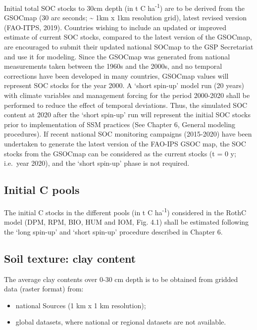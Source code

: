 \documentclass[
  10pt,
  b5paper,
]{book}
\providecommand{\tightlist}{%
  \setlength{\itemsep}{0pt}\setlength{\parskip}{0pt}}
\begin{document}
Initial total SOC stocks to 30cm depth (in t C ha\textsuperscript{-1}) are to be derived from the GSOCmap (30 arc seconds; \textasciitilde{} 1km x 1km resolution grid), latest revised version (FAO-ITPS, 2019). Countries wishing to include an updated or improved estimate of current SOC stocks, compared to the latest version of the GSOCmap, are encouraged to submit their updated national SOCmap to the GSP Secretariat and use it for modeling.
Since the GSOCmap was generated from national measurements taken between the 1960s and the 2000s, and no temporal corrections have been developed in many countries, GSOCmap values will represent SOC stocks for the year 2000. A `short spin-up' model run (20 years) with climate variables and management forcing for the period 2000-2020 shall be performed to reduce the effect of temporal deviations. Thus, the simulated SOC content at 2020 after the `short spin-up' run will represent the initial SOC stocks prior to implementation of SSM practices (See Chapter 6, General modeling procedures). If recent national SOC monitoring campaigns (2015-2020) have been undertaken to generate the latest version of the FAO-IPS GSOC map, the SOC stocks from the GSOCmap can be considered as the current stocks (t = 0 y; i.e.~year 2020), and the `short spin-up' phase is not required.

\hypertarget{initial-c-pools}{%
\subsection{Initial C pools}\label{initial-c-pools}}

The initial C stocks in the different pools (in t C ha\textsuperscript{-1}) considered in the RothC model (DPM, RPM, BIO, HUM and IOM, Fig. 4.1) shall be estimated following the `long spin-up' and `short spin-up' procedure described in Chapter 6.

\hypertarget{soil-texture-clay-content}{%
\subsection{Soil texture: clay content}\label{soil-texture-clay-content}}

The average clay contents over 0-30 cm depth is to be obtained from gridded data (raster format) from:

\begin{itemize}
\tightlist
\item
  national Sources (1 km x 1 km resolution);
\item
  global datasets, where national or regional datasets are not available.
\end{itemize}
\end{document}
